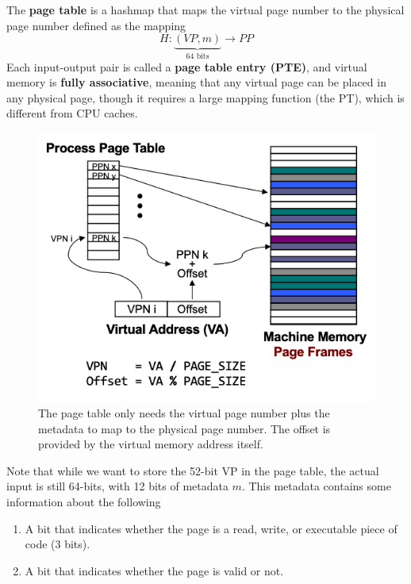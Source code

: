 \documentclass{article}
\begin{document}
    \begin{definition}
      The \textbf{page table} is a hashmap that maps the virtual page number to the physical page number defined as the mapping 
      \begin{equation}
        H: \underbrace{(VP,m)}_{\text{64 bits}} \longrightarrow PP
      \end{equation}
      Each input-output pair is called a \textbf{page table entry (PTE)}, and virtual memory is \textbf{fully associative}, meaning that any virtual page can be placed in any physical page, though it requires a large mapping function (the PT), which is different from CPU caches. 
      \begin{figure}[H]
        \centering 
        \includegraphics[scale=0.4]{img/page_table.png}
        \caption{The page table only needs the virtual page number plus the metadata to map to the physical page number. The offset is provided by the virtual memory address itself. } 
        \label{fig:page_table}
      \end{figure}
      Note that while we want to store the 52-bit VP in the page table, the actual input is still 64-bits, with 12 bits of metadata $m$. This metadata contains some information about the following 
      \begin{enumerate}
        \item A bit that indicates whether the page is a read, write, or executable piece of code (3 bits). 
        \item A bit that indicates whether the page is valid or not. 

\end{enumerate}
\end{definition}
\end{document}
